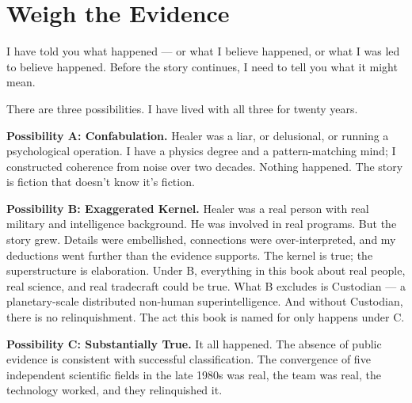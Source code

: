 

\chapter*{Weigh the Evidence}
\label{interlude:three-possibilities}

I have told you what happened --- or what I believe happened, or what I was led to believe happened. Before the story continues, I need to tell you what it might mean.

There are three possibilities. I have lived with all three for twenty years.

\vspace{0.5cm}

\textbf{Possibility A: Confabulation.} Healer was a liar, or delusional, or running a psychological operation. I have a physics degree and a pattern-matching mind; I constructed coherence from noise over two decades. Nothing happened. The story is fiction that doesn't know it's fiction.

\textbf{Possibility B: Exaggerated Kernel.} Healer was a real person with real military and intelligence background. He was involved in real programs. But the story grew. Details were embellished, connections were over-interpreted, and my deductions went further than the evidence supports. The kernel is true; the superstructure is elaboration. Under B, everything in this book about real people, real science, and real tradecraft could be true. What B excludes is Custodian --- a planetary-scale distributed non-human superintelligence. And without Custodian, there is no relinquishment. The act this book is named for only happens under C.

\textbf{Possibility C: Substantially True.} It all happened. The absence of public evidence is consistent with successful classification. The convergence of five independent scientific fields in the late 1980s was real, the team was real, the technology worked, and they relinquished it.

